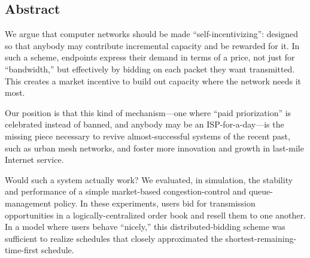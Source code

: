 \subsection*{Abstract}
We argue that computer networks should be made ``self-incentivizing'':
designed so that anybody may contribute incremental capacity and be
rewarded for it. In such a scheme, endpoints express their demand in
terms of a price, not just for ``bandwidth,'' but effectively by
bidding on each packet they want transmitted. This creates a market
incentive to build out capacity where the network needs it most.

Our position is that this kind of mechanism---one where ``paid
priorization'' is celebrated instead of banned, and anybody may be an
ISP-for-a-day---is the missing piece necessary to revive
almost-successful systems of the recent past, such as urban mesh
networks, and foster more innovation and growth in last-mile Internet service.

Would such a system actually work? We evaluated, in simulation, the
stability and performance of a simple market-based congestion-control and queue-management
policy. In these experiments, users bid for
transmission opportunities in a logically-centralized order book and
resell them to one another. In a model where users behave ``nicely,''
this distributed-bidding scheme was sufficient to realize schedules
that closely approximated the shortest-remaining-time-first
schedule.
